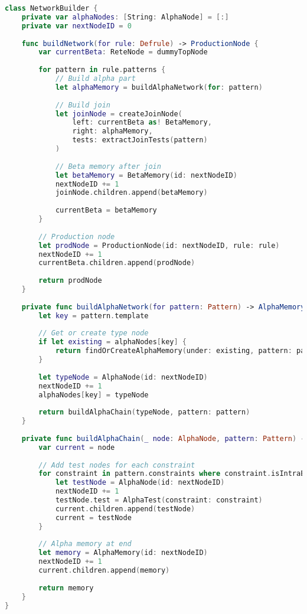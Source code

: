 \begin{lstlisting}[language=Swift]
class NetworkBuilder {
    private var alphaNodes: [String: AlphaNode] = [:]
    private var nextNodeID = 0
    
    func buildNetwork(for rule: Defrule) -> ProductionNode {
        var currentBeta: ReteNode = dummyTopNode
        
        for pattern in rule.patterns {
            // Build alpha part
            let alphaMemory = buildAlphaNetwork(for: pattern)
            
            // Build join
            let joinNode = createJoinNode(
                left: currentBeta as! BetaMemory,
                right: alphaMemory,
                tests: extractJoinTests(pattern)
            )
            
            // Beta memory after join
            let betaMemory = BetaMemory(id: nextNodeID)
            nextNodeID += 1
            joinNode.children.append(betaMemory)
            
            currentBeta = betaMemory
        }
        
        // Production node
        let prodNode = ProductionNode(id: nextNodeID, rule: rule)
        nextNodeID += 1
        currentBeta.children.append(prodNode)
        
        return prodNode
    }
    
    private func buildAlphaNetwork(for pattern: Pattern) -> AlphaMemory {
        let key = pattern.template
        
        // Get or create type node
        if let existing = alphaNodes[key] {
            return findOrCreateAlphaMemory(under: existing, pattern: pattern)
        }
        
        let typeNode = AlphaNode(id: nextNodeID)
        nextNodeID += 1
        alphaNodes[key] = typeNode
        
        return buildAlphaChain(typeNode, pattern: pattern)
    }
    
    private func buildAlphaChain(_ node: AlphaNode, pattern: Pattern) -> AlphaMemory {
        var current = node
        
        // Add test nodes for each constraint
        for constraint in pattern.constraints where constraint.isIntraElement {
            let testNode = AlphaNode(id: nextNodeID)
            nextNodeID += 1
            testNode.test = AlphaTest(constraint: constraint)
            current.children.append(testNode)
            current = testNode
        }
        
        // Alpha memory at end
        let memory = AlphaMemory(id: nextNodeID)
        nextNodeID += 1
        current.children.append(memory)
        
        return memory
    }
}
\end{lstlisting}

